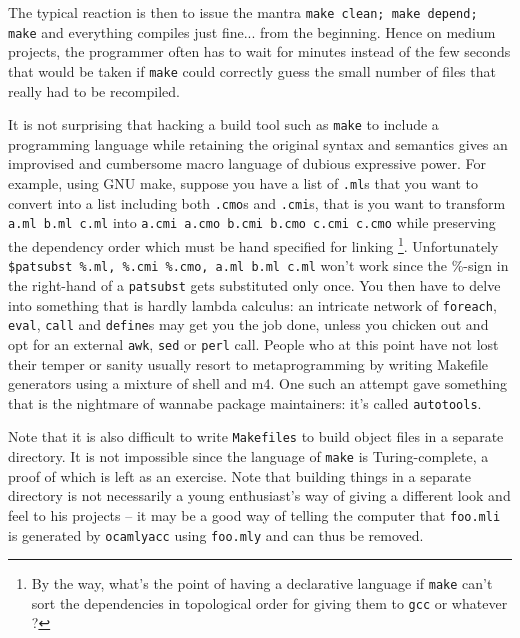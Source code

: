 \documentclass[9pt]{article}
\begin{document}
The typical reaction is then to issue the mantra \texttt{make clean; make
depend; make} and everything compiles just fine... from the beginning.  Hence
on medium projects, the programmer often has to wait for minutes instead of the
few seconds that would be taken if \texttt{make} could correctly guess the
small number of files that really had to be recompiled.

It is not surprising that hacking a build tool such as \texttt{make} to include
a programming language while retaining the original syntax and semantics gives
an improvised and cumbersome macro language of dubious expressive power.  For
example, using GNU make, suppose you have a list of \texttt{.ml}s that you want
to convert into a list including both \texttt{.cmo}s and \texttt{.cmi}s, that
is you want to transform \texttt{a.ml b.ml c.ml} into \texttt{a.cmi a.cmo b.cmi
b.cmo c.cmi c.cmo} while preserving the dependency order which must be hand
specified for linking \footnote{By the way, what's the point of having a
declarative language if \texttt{make} can't sort the dependencies in
topological order for giving them to \texttt{gcc} or whatever ?}.
Unfortunately \texttt{\$patsubst \%.ml, \%.cmi \%.cmo, a.ml b.ml c.ml} won't
work since the \%-sign in the right-hand of a \texttt{patsubst} gets
substituted only once.  You then have to delve into something that is hardly
lambda calculus: an intricate network of \texttt{foreach}, \texttt{eval},
\texttt{call} and \texttt{define}s may get you the job done, unless you chicken
out and opt for an external \texttt{awk}, \texttt{sed} or \texttt{perl} call.
People who at this point have not lost their temper or sanity usually resort to
metaprogramming by writing Makefile generators using a mixture of shell and m4.
One such an attempt gave something that is the nightmare of wannabe package
maintainers: it's called \texttt{autotools}.

Note that it is also difficult to write \texttt{Makefiles} to build object
files in a separate directory.  It is not impossible since the language of
\texttt{make} is Turing-complete, a proof of which is left as an exercise.
Note that building things in a separate directory is not necessarily a young
enthusiast's way of giving a different look and feel to his projects -- it may
be a good way of telling the computer that \texttt{foo.mli} is generated by
\texttt{ocamlyacc} using \texttt{foo.mly} and can thus be removed.
\end{document}
